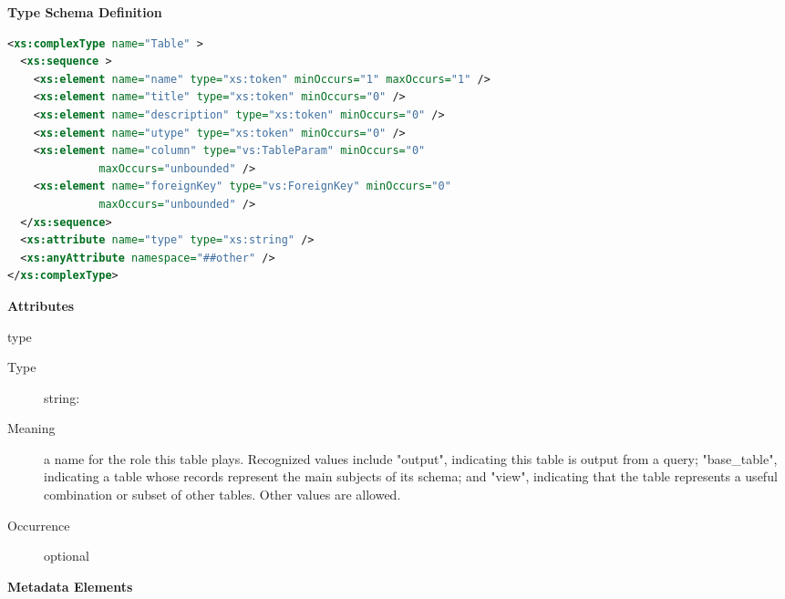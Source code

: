 \documentclass[11pt,a4paper]{ivoa}
\begin{document}
\begin{generated}
\begingroup
      	\renewcommand*\descriptionlabel[1]{%
      	\hbox to 5.5em{\emph{#1}\hfil}}\vspace{1ex}\noindent\textbf{ Type Schema Definition}

\begin{lstlisting}[language=XML,basicstyle=\footnotesize]
<xs:complexType name="Table" >
  <xs:sequence >
    <xs:element name="name" type="xs:token" minOccurs="1" maxOccurs="1" />
    <xs:element name="title" type="xs:token" minOccurs="0" />
    <xs:element name="description" type="xs:token" minOccurs="0" />
    <xs:element name="utype" type="xs:token" minOccurs="0" />
    <xs:element name="column" type="vs:TableParam" minOccurs="0"
              maxOccurs="unbounded" />
    <xs:element name="foreignKey" type="vs:ForeignKey" minOccurs="0"
              maxOccurs="unbounded" />
  </xs:sequence>
  <xs:attribute name="type" type="xs:string" />
  <xs:anyAttribute namespace="##other" />
</xs:complexType>
\end{lstlisting}

\vspace{0.5ex}\noindent\textbf{ Attributes}

\begingroup\small\begin{bigdescription}
\item[type]
\begin{description}
\item[Type] string: 
\item[Meaning] 
               a name for the role this table plays.  Recognized
               values include {"}output{"}, indicating this table is output 
               from a query; {"}base\_table{"}, indicating a table
               whose records represent the main subjects of its
               schema; and {"}view{"}, indicating that the table represents
               a useful combination or subset of other tables.  Other 
               values are allowed.  
            
\item[Occurrence] optional
\end{description}


\end{bigdescription}\endgroup



\vspace{0.5ex}\noindent\textbf{ Metadata Elements}


\end{generated}
\end{document}
